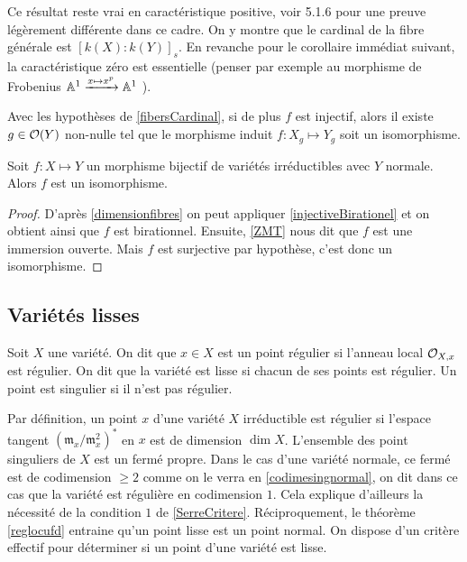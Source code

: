 Ce résultat reste vrai en caractéristique positive, voir \cite{LAGSpringer} 5.1.6 pour une preuve légèrement différente dans ce cadre. On y montre que le cardinal de la fibre générale est $[k(X):k(Y)]_s$. En revanche pour le corollaire immédiat suivant, la caractéristique zéro est essentielle (penser par exemple au morphisme de Frobenius $\mathbb{A}^1 \xrightarrow{x \mapsto x^p} \mathbb{A}^1$ ). 

\begin{cor}\label{injectiveBirationel}
Avec les hypothèses de \ref{fibersCardinal}, si de plus $f$ est injectif, alors il existe $g\in \mathcal{O}(Y)$ non-nulle tel que le morphisme induit $f:X_g \mapsto Y_g$ soit un isomorphisme.
\end{cor}

\begin{thm}\label{ZMTCor}
Soit $f:X \mapsto Y$ un morphisme bijectif de variétés irréductibles avec $Y$ normale. Alors $f$ est un isomorphisme.
\end{thm}
\begin{proof}
D'après \ref{dimensionfibres} on peut appliquer \ref{injectiveBirationel} et on obtient ainsi que $f$ est birationnel. Ensuite, \ref{ZMT} nous dit que $f$ est une immersion ouverte. Mais $f$ est surjective par hypothèse, c'est donc un isomorphisme.
\end{proof}

\subsection{Variétés lisses}

\begin{defn}
Soit $X$ une variété. On dit que $x\in X$ est un point régulier si l'anneau local $\mathcal{O}_{X,x}$ est régulier. On dit que la variété est lisse si chacun de ses points est régulier. Un point est singulier si il n'est pas régulier.
\end{defn}

Par définition, un point $x$ d'une variété $X$ irréductible est régulier si l'espace tangent $(\mathfrak{m}_x/\mathfrak{m}_x^2)^*$ en $x$ est de dimension $\dim X$. L'ensemble des point singuliers de $X$ est un fermé propre. Dans le cas d'une variété normale, ce fermé est de codimension $\geq 2$ comme on le verra en \ref{codimesingnormal}, on dit dans ce cas que la variété est régulière en codimension $1$. Cela explique d'ailleurs la nécessité de la condition $1$ de \ref{SerreCritere}. Réciproquement, le théorème \ref{reglocufd} entraine qu'un point lisse est un point normal. On dispose d'un critère effectif pour déterminer si un point d'une variété est lisse.

